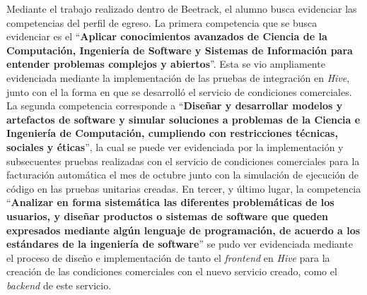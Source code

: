 Mediante el trabajo realizado dentro de Beetrack, el alumno busca evidenciar las competencias del perfil de egreso. La primera competencia que se busca evidenciar es el ``\textbf{Aplicar conocimientos avanzados de Ciencia de la Computación, Ingeniería de Software y Sistemas de Información para entender problemas complejos y abiertos}''. Esta se vio ampliamente evidenciada mediante la implementación de las pruebas de integración en \textit{Hive}, junto con el la forma en que se desarrolló el servicio de condiciones comerciales. La segunda competencia corresponde a ``\textbf{Diseñar y desarrollar modelos y artefactos de software y simular soluciones a problemas de la Ciencia e Ingeniería de Computación, cumpliendo con restricciones técnicas, sociales y éticas}'', la cual se puede ver evidenciada por la implementación y subsecuentes pruebas realizadas con el servicio de condiciones comerciales para la facturación automática el mes de octubre junto con la simulación de ejecución de código en las pruebas unitarias creadas. En tercer, y último lugar, la competencia ``\textbf{Analizar en forma sistemática las diferentes problemáticas de los usuarios, y diseñar productos o sistemas de software que queden expresados mediante algún lenguaje de programación, de acuerdo a los estándares de la ingeniería de software}'' se pudo ver evidenciada mediante el proceso de diseño e implementación de tanto el \textit{frontend} en \textit{Hive} para la creación de las condiciones comerciales con el nuevo servicio creado, como el \textit{backend} de este servicio.